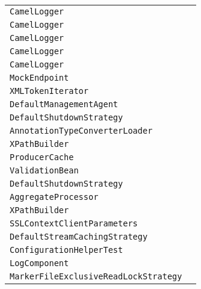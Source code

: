 \begin{center}
\begin{tabular}{ll}
\lstinline/CamelLogger/&\raisebox{0pt}{\lstinline/log(String)/}\\
\lstinline/CamelLogger/&\raisebox{0pt}{\lstinline/log(String,Throwable)/}\\
\lstinline/CamelLogger/&\raisebox{0pt}{\lstinline/log(String)/}\\
\lstinline/CamelLogger/&\raisebox{0pt}{\lstinline/log(String)/}\\
\lstinline/CamelLogger/&\raisebox{0pt}{\lstinline/log(String,Throwable)/}\\
\lstinline/MockEndpoint/&\raisebox{0pt}{\lstinline/doAssertIsSatisfied(long)/}\\
\lstinline/XMLTokenIterator/&\raisebox{0pt}{\lstinline/XMLTokenIterator(String/}\\
\lstinline/DefaultManagementAgent/&\raisebox{0pt}{\lstinline/registerMBeanWithServer(Object/}\\
\lstinline/DefaultShutdownStrategy/&\raisebox{0pt}{\lstinline/prepareShutdown(Service)/}\\
\lstinline/AnnotationTypeConverterLoader/&\raisebox{0pt}{\lstinline/loadConverterMethods(TypeConverterRegistry)/}\\
\lstinline/XPathBuilder/&\raisebox{0pt}{\lstinline/XPathFactorycreateDefaultXPathFactory()/}\\
\lstinline/ProducerCache/&\raisebox{0pt}{\lstinline/<T>TdoInProducer(Endpoint))/}\\
\lstinline/ValidationBean/&\raisebox{0pt}{\lstinline/someMethod(String)n/}\\
\lstinline/DefaultShutdownStrategy/&\raisebox{0pt}{\lstinline/booleandoShutdown(CamelContext)/}\\
\lstinline/AggregateProcessor/&\raisebox{0pt}{\lstinline/doStart()/}\\
\lstinline/XPathBuilder/&\raisebox{0pt}{\lstinline/XPathFactorycreateDefaultXPathFactory()/}\\
\lstinline/SSLContextClientParameters/&\raisebox{0pt}{\lstinline/configureSSLContext(SSLContext)/}\\
\lstinline/DefaultStreamCachingStrategy/&\raisebox{0pt}{\lstinline/doStart()/}\\
\lstinline/ConfigurationHelperTest/&\raisebox{0pt}{\lstinline/logConfigurationField(EndpointConfiguration)/}\\
\lstinline/LogComponent/&\raisebox{0pt}{\lstinline/EndpointcreateEndpoint(String)/}\\
\lstinline/MarkerFileExclusiveReadLockStrategy/&\raisebox{0pt}{\lstinline/prepareOnStartup()/}\\

\end{tabular}
\end{center}
